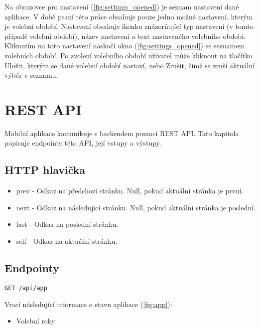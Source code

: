 Na obrazovce pro nastavení (\ref{fig:settings_opened}) je seznam nastavení dané aplikace. V době psaní této práce obsahuje pouze jedno možné nastavení, kterým je volební období. Nastavení obsahuje ikonku znázorňující typ nastavení (v tomto případě volební období), název nastavení a text nastaveného volebního obdobi. Kliknutím na toto nastavení naskočí okno (\ref{fig:settings_opened}) se seznamem volebních období. Po zvolení volebního období uživatel může kliknout na tlačítko Uložit, kterým se dané volební období nastaví, nebo Zrušit, čímž se zruší aktuální výběr v seznamu.

\section{REST API}

Mobilní aplikace komunikuje s backendem pomocí REST API. Tato kapitola popisuje endpointy této API, její vstupy a výstupy.

\subsection*{HTTP hlavička}

\begin{itemize}
	\item prev - Odkaz na předchozí stránku. Null, pokud aktuální stránka je první.
	\item next - Odkaz na následující stránku. Null, pokud aktuální stránka je poslední.
	\item last - Odkaz na poslední stránku.
	\item self - Odkaz na aktuální stránku.
\end{itemize}

\subsection*{Endpointy}

\begin{lstlisting}
GET /api/app
\end{lstlisting}

\noindent Vrací následující informace o stavu aplikace (\ref{fig:app}):

\begin{itemize}
	\item Volební roky
\end{itemize}

\vspace{10px}

